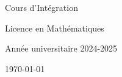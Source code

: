 \begin{titlepage}
    \centering
    \vspace*{1cm}

    \Huge
    Cours d'Intégration

    \vspace{0.5cm}

    \LARGE
    Licence en Mathématiques

    \vspace{1.5cm}


    \vfill

    \Large
    Année universitaire 2024-2025

    \vspace{0.8cm}

    \today
\end{titlepage}
